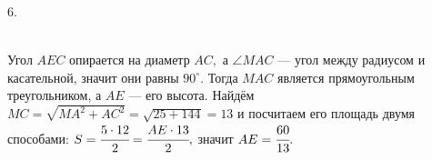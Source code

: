 6. \begin{figure}[ht!]
\end{figure}\\
Угол $AEC$ опирается на диаметр $AC,$ а $\angle MAC$ --- угол между радиусом и касательной, значит они равны $90^\circ.$ Тогда $MAC$ является прямоугольным треугольником, а $AE$ --- его высота. Найдём $MC=\sqrt{MA^2+AC^2}=\sqrt{25+144}=13$ и посчитаем его площадь двумя способами: $S=\cfrac{5\cdot12}{2}=\cfrac{AE\cdot13}{2},$ значит $AE=\cfrac{60}{13}.$\\
